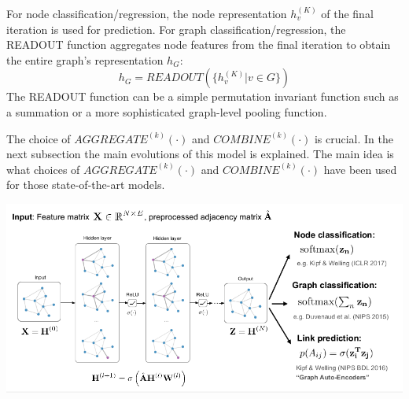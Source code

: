For node classification/regression, the node representation $h_v^{(K)}$ of the final iteration is used for prediction. For graph classification/regression, the READOUT function aggregates node features from the final iteration to obtain the entire graph's representation $h_G$:
$$h_G = READOUT(\{h_v^{(K)} | v \in G\})$$
The READOUT function can be a simple permutation invariant function such as a summation or a more sophisticated graph-level pooling function.

The choice of $AGGREGATE^{(k)}(\cdot)$ and $COMBINE^{(k)}(\cdot)$ is crucial. In the next subsection the main evolutions of this model is explained. The main idea is what choices of $AGGREGATE^{(k)}(\cdot)$ and $COMBINE^{(k)}(\cdot)$  have been used for those state-of-the-art models. 


\includegraphics[scale=0.5]{./img/GNN-schema.png}\\[2cm] 









